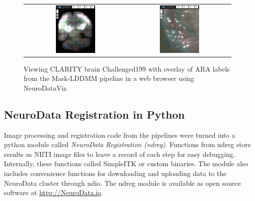\documentclass[]{spie}  %
\begin{document}
\begin{figure}[t]
 \begin{center}
  \begin{tabular}{c c}
   \includegraphics[width=0.4\textwidth]{ndviz1} & \includegraphics[width=0.4\textwidth]{ndviz2} 
  \end{tabular}
 \end{center}
 \caption{Viewing CLARITY brain Challenged199 with overlay of ARA labels from the Mask-LDDMM pipeline in a web browser using NeuroDataViz.}
 \label{fig:ndviz}
\end{figure} 

\subsection{NeuroData Registration in Python}
Image processing and registration code from the pipelines were turned into a python module called \emph{NeuroData Registration (ndreg)}.
Functions from ndreg store results as NIfTI image files to leave a record of each step for easy debugging.
Internally, these functions called SimpleITK or custom binaries.
The module also includes convenience functions for downloading and uploading data to the NeuroData cluster through ndio.
The ndreg module is available as open source software at \url{http://NeuroData.io}.
\end{document}
